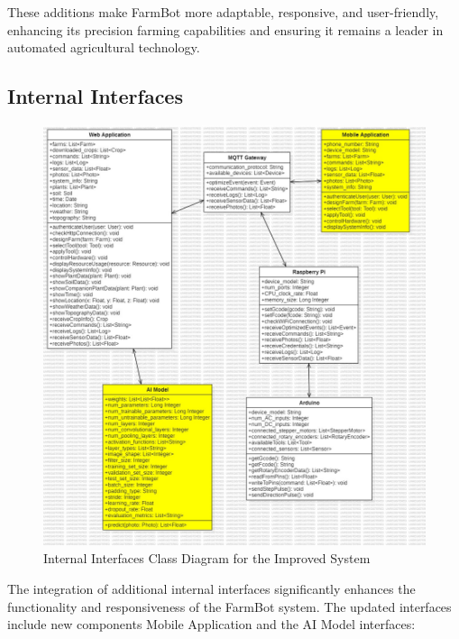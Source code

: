 These additions make FarmBot more adaptable, responsive, and user-friendly, enhancing its precision farming capabilities and ensuring it remains a leader in automated agricultural technology.

\newpage
\subsection{Internal Interfaces}
\begin{figure}[htbp]
    \centering
    \includegraphics[width=0.9\linewidth]{Figures/improved_internal_interfaces.jpg}
    \caption{Internal Interfaces Class Diagram for the Improved System}
    \label{InternalImproved}
\end{figure}
\newpage
The integration of additional internal interfaces significantly enhances the functionality and responsiveness of the FarmBot system. The updated interfaces include new components Mobile Application and the AI Model interfaces:

